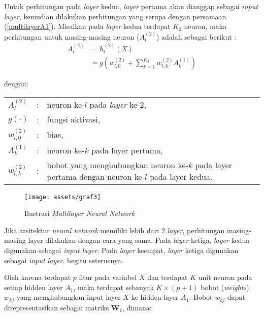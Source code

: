 \documentclass[a4paper,12pt]{report}
\begin{document}
Untuk perhitungan pada \textit{layer} kedua, \textit{layer} pertama akan dianggap sebagai \textit{input layer}, kemudian dilakukan perhitungan yang serupa dengan persamaan (\ref{multilayerA1}). Misalkan pada \textit{layer} kedua terdapat $K_2$ neuron, maka perhitungan untuk masing-masing neuron ($A_l^{(2)}$) adalah sebagai berikut :
\begin{equation}
	\begin{split}
		A_l^{(2)} &= h_l^{(2)}(X) \\
		&= g\left(w_{l,0}^{(2)} + \sum\limits_{k=1}^{K_1}w_{l,k}^{(2)}A_{k}^{(1)}\right)
	\end{split}
	\label{multilayerA2}
\end{equation}

\noindent dengan: \\
\begin{tabular}{p{1cm} p{0.5cm} p{10cm}}
	$A_l^{(2)}$ &:& neuron ke-$l$ pada \textit{layer} ke-2, \\
	$g(\cdot)$ &:& fungsi aktivasi, \\
	$w_{l,0}^{(2)}$ &:& bias, \\
	$A_k^{(1)}$ &:& neuron ke-$k$ pada layer pertama, \\
	$w_{l,k}^{(2)}$ &:& bobot yang menghubungkan neuron ke-$k$ pada layer pertama dengan neuron ke-$l$ pada layer kedua.
\end{tabular}

\begin{figure}[H]
	\center \texttt{[image: assets/graf3]}
	\caption{Ilustrasi \textit{Multilayer Neural Network}} 
	\label{sumbar}
\end{figure} 
Jika arsitektur \textit{neural network} memiliki lebih dari 2 \textit{layer}, perhitungan masing-masing layer dilakukan dengan cara yang sama. Pada \textit{layer} ketiga, \textit{layer} kedua digunakan sebagai \textit{input layer}. Pada \textit{layer} keempat, \textit{layer} ketiga digunakan sebagai \textit{input layer}, begitu seterusnya. 

Oleh karena terdapat $p$ fitur pada variabel $X$ dan terdapat $K$ unit neuron pada setiap hidden layer $A_1$, maka terdapat sebanyak $K \times (p+1)$ bobot (\textit{weights}) $w_{kj}$ yang menghubungkan input layer $X$ ke hidden layer $A_1$. Bobot $w_{kj}$ dapat direpresentasikan sebagai matriks $\mathbf{W}_1$, dimana:
\end{document}
